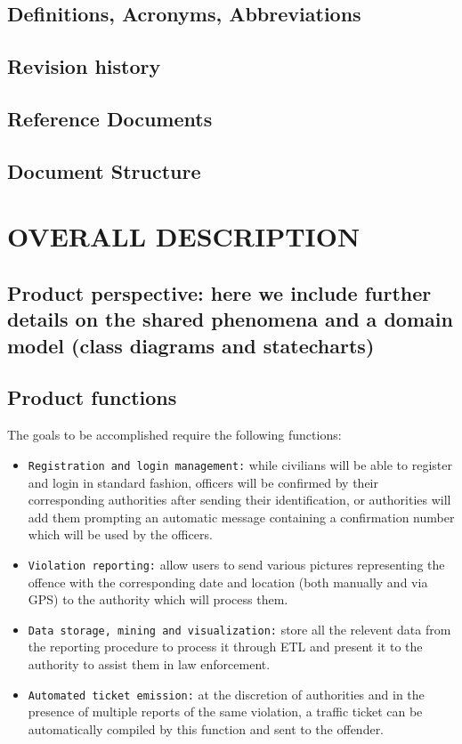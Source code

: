 \documentclass[12pt,a4paper]{article}
\begin{document}
\subsection{Definitions,	Acronyms,	Abbreviations} 
\subsection{Revision history} 
\subsection{Reference	Documents} 
\subsection{Document	Structure} 
\section{OVERALL	DESCRIPTION}
\subsection{Product	perspective:	here	we	include	 further	details	on	 the	 shared	phenomena	and	a	
domain	model	(class	diagrams	and	statecharts)} 
\subsection{Product	functions}
The goals to be accomplished require the following functions:
 \begin{itemize}
\item \texttt{Registration and login management:} while civilians will be able to register and login in standard fashion, officers will be confirmed by their corresponding authorities after sending their identification, or authorities will add them prompting an automatic message containing a confirmation number which will be used by the officers. 
\item \texttt{Violation reporting:} allow users to send various pictures representing the offence with the corresponding date and location (both manually and via GPS) to the authority which will process them.
\item  \texttt{Data storage, mining and visualization:} store all the relevent data from the reporting procedure to process it through ETL and present it to the authority to assist them in law enforcement. 
\item  \texttt{Automated ticket emission:} at the discretion of authorities and in the presence of multiple reports of the same violation, a traffic ticket can be automatically compiled by this function and sent to the offender.
\end{itemize}
\end{document}
